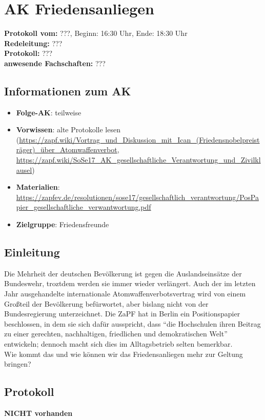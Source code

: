 
\section{AK Friedensanliegen}

	\textbf{Protokoll vom:} ???,
	Beginn: 16:30 Uhr,
	Ende: 18:30 Uhr \\
	\textbf{Redeleitung:} ??? \\
	\textbf{Protokoll:} ??? \\
	\textbf{anwesende Fachschaften:} ???

	\subsection*{Informationen zum AK}
		\begin{itemize}
			\item \textbf{Folge-AK}: teilweise
			\item \textbf{Vorwissen}: alte Protokolle lesen (\url{https://zapf.wiki/Vortrag_und_Diskussion_mit_Ican_(Friedensnobelpreisträger)_über_Atomwaffenverbot}, \url{https://zapf.wiki/SoSe17_AK_gesellschaftliche_Verantwortung_und_Zivilklausel})
      \item \textbf{Materialien}: \url{https://zapfev.de/resolutionen/sose17/gesellschaftlich_verantwortung/PosPapier_gesellschaftliche_verwantwortung.pdf}
			\item \textbf{Zielgruppe}: Friedensfreunde
		\end{itemize}

  \subsection{Einleitung}
    Die Mehrheit der deutschen Bevölkerung ist gegen die Auslandseinsätze der Bundeswehr, troztdem werden sie immer wieder verlängert. Auch der im letzten Jahr ausgehandelte internationale Atomwaffenverbotsvertrag wird von einem Großteil der Bevölkerung befürwortet, aber bislang nicht von der Bundesregierung unterzeichnet. Die ZaPF hat in Berlin ein Positionspapier beschlossen, in dem sie sich dafür ausspricht, dass ``die Hochschulen ihren Beitrag zu einer gerechten, nachhaltigen, friedlichen und demokratischen Welt'' entwickeln; dennoch macht sich dies im Alltagsbetrieb selten bemerkbar. \\

    Wie kommt das und wie können wir das Friedensanliegen mehr zur Geltung bringen?

  \subsection*{Protokoll}
    \textbf{NICHT vorhanden}
